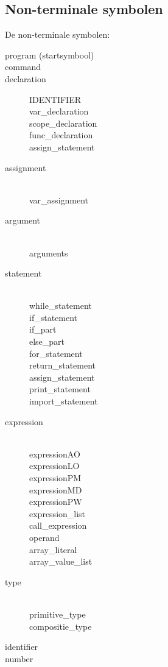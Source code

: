 \subsection{Non-terminale symbolen} %
\label{sub:non_terminale_symbolen}
De non-terminale symbolen:
\begin{description}
    \item[program (startsymbool)] 
    \item[command]
    \item[declaration] IDENTIFIER\hfill \\
        var\_declaration \\
        scope\_declaration \\
        func\_declaration \\
        assign\_statement
    \item[assignment] \hfill \\
        var\_assignment
    \item[argument] \hfill \\
        arguments
    \item[statement] \hfill \\
        while\_statement \\
        if\_statement \\ 
        if\_part \\
        else\_part \\
        for\_statement \\
        return\_statement \\
        assign\_statement \\
        print\_statement \\
        import\_statement
    \item[expression] \hfill \\
        expressionAO \\
        expressionLO \\
        expressionPM \\
        expressionMD \\
        expressionPW \\
        expression\_list \\
        call\_expression \\
        operand \\
        array\_literal \\
        array\_value\_list
    \item[type] \hfill \\
        primitive\_type \\
        compositie\_type
    \item[identifier]
    \item[number]
\end{description}

